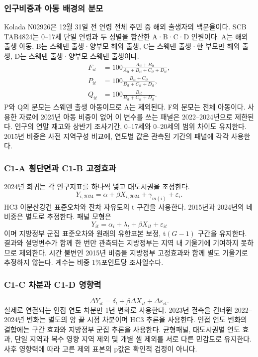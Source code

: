 \documentclass[11pt,a4paper]{article}
\begin{document}
\subsubsection{인구비중과 아동 배경의 분모}
Kolada N02926은 12월 31일 전 연령 전체 주민 중 해외 출생자의 백분율이다. SCB TAB4824\cite{scb}는 0--17세 단일 연령과 두 성별을 합산한 A·B·C·D 인원이다. A는 해외 출생 아동, B는 스웨덴 출생·양부모 해외 출생, C는 스웨덴 출생·한 부모만 해외 출생, D는 스웨덴 출생·양부모 스웨덴 출생이다.
\begin{align}
F_{it}&=100\frac{A_{it}+B_{it}}{A_{it}+B_{it}+C_{it}+D_{it}},\\
P_{it}&=100\frac{B_{it}+C_{it}}{B_{it}+C_{it}+D_{it}},\\
Q_{it}&=100\frac{B_{it}}{B_{it}+C_{it}+D_{it}}.
\end{align}
P와 Q의 분모는 스웨덴 출생 아동이므로 A는 제외된다. F의 분모는 전체 아동이다. 사용한 자료에 2025년 아동 비중이 없어 이 변수를 쓰는 패널은 2022--2024년으로 제한된다. 인구의 연말 재고와 상반기 조사기간, 0--17세와 0--20세의 범위 차이도 유지한다. 2015년 비중은 사전 지역구성 비교에, 연도별 값은 관측된 기간의 패널에 각각 사용한다.

\subsubsection{C1-A 횡단면과 C1-B 고정효과}
2024년 회귀는 각 인구지표를 하나씩 넣고 대도시권을 조정한다.
\begin{equation}Y_{i,2024}=\alpha+\beta X_{i,2024}+\gamma_{m(i)}+\varepsilon_i.\end{equation}
HC3 이분산강건 표준오차와 잔차 자유도의 t 구간을 사용한다. 2015년과 2024년의 네 비중은 별도로 추정한다. 패널 모형은
\begin{equation}Y_{it}=\alpha_i+\lambda_t+\beta X_{it}+\varepsilon_{it}\end{equation}
이며 지방정부 군집 표준오차와 원래의 유한표본 보정, t$(G-1)$ 구간을 유지한다. 결과와 설명변수가 함께 한 번만 관측되는 지방정부는 지역 내 기울기에 기여하지 못하므로 제외한다. 시간 불변인 2015년 비중을 지방정부 고정효과와 함께 별도 기울기로 추정하지 않는다. 계수는 비중 1\%포인트당 조사일수다.

\subsubsection{C1-C 차분과 C1-D 영향력}
\begin{equation}\Delta Y_{it}=\delta_t+\beta\Delta X_{it}+\Delta\varepsilon_{it}.\end{equation}
실제로 연결되는 인접 연도 차분만 1년 변화로 사용한다. 2023년 결측을 건너뛴 2022--2024년 변화는 별도의 양 끝 시점 차분이며 HC3 추론을 사용한다. 인접 연도 변화의 결합에는 구간 효과와 지방정부 군집 추론을 사용한다. 균형패널, 대도시권별 연도 효과, 단일 지역과 복수 영향 지역 제외 및 개별 셀 제외를 서로 다른 민감도로 유지한다. 사후 영향력에 따라 고른 제외 표본의 p값은 확인적 검정이 아니다.
\end{document}
